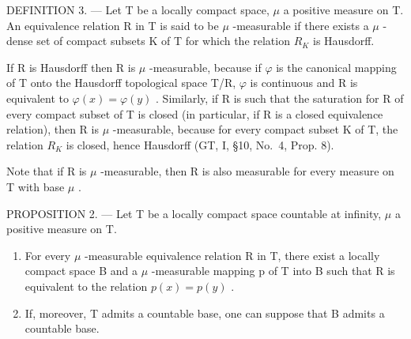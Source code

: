 DEFINITION 3. --- Let T be a locally compact space, \(\mu\) a positive measure on T. An equivalence relation R in T is said to be \(\mu\) -measurable if there exists a \(\mu\) -dense set of compact subsets K of T for which the relation \(R_{K}\) is Hausdorff.

If R is Hausdorff then R is \(\mu\) -measurable, because if \(\varphi\) is the canonical mapping of T onto the Hausdorff topological space T/R, \(\varphi\) is continuous and R is equivalent to \(\varphi(x)=\varphi(y)\) . Similarly, if R is such that the saturation for R of every compact subset of T is closed (in particular, if R is a closed equivalence relation), then R is \(\mu\) -measurable, because for every compact subset K of T, the relation \(R_{K}\) is closed, hence Hausdorff (GT, I, §10, No.~4, Prop. 8).

Note that if R is \(\mu\) -measurable, then R is also measurable for every measure on T with base \(\mu\) .

PROPOSITION 2. --- Let T be a locally compact space countable at infinity, \(\mu\) a positive measure on T.

\begin{enumerate}
\def\labelenumi{\arabic{enumi})}
\item
  For every \(\mu\) -measurable equivalence relation R in T, there exist a locally compact space B and a \(\mu\) -measurable mapping p of T into B such that R is equivalent to the relation \(p(x) = p(y)\) .
\item
  If, moreover, T admits a countable base, one can suppose that B admits a countable base.
\end{enumerate}

